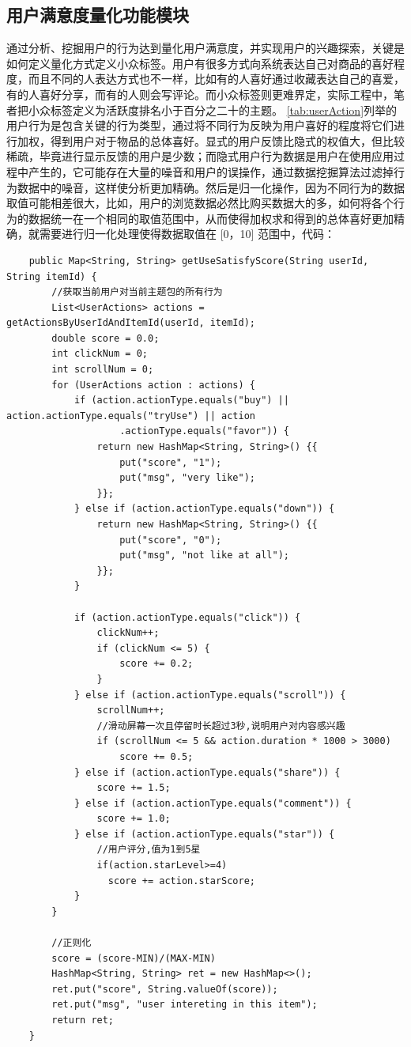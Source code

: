   \subsection{用户满意度量化功能模块}
  通过分析、挖掘用户的行为达到量化用户满意度，并实现用户的兴趣探索，关键是如何定义量化方式定义小众标签。用户有很多方式向系统表达自己对商品的喜好程度，而且不同的人表达方式也不一样，比如有的人喜好通过收藏表达自己的喜爱，有的人喜好分享，而有的人则会写评论。而小众标签则更难界定，实际工程中，笔者把小众标签定义为活跃度排名小于百分之二十的主题。
  \autoref{tab:userAction}列举的用户行为是包含关键的行为类型，通过将不同行为反映为用户喜好的程度将它们进行加权，得到用户对于物品的总体喜好。显式的用户反馈比隐式的权值大，但比较稀疏，毕竟进行显示反馈的用户是少数；而隐式用户行为数据是用户在使用应用过程中产生的，它可能存在大量的噪音和用户的误操作，通过数据挖掘算法过滤掉行为数据中的噪音，这样使分析更加精确。然后是归一化操作，因为不同行为的数据取值可能相差很大，比如，用户的浏览数据必然比购买数据大的多，如何将各个行为的数据统一在一个相同的取值范围中，从而使得加权求和得到的总体喜好更加精确，就需要进行归一化处理使得数据取值在 [0，10] 范围中，代码：
  \begin{lstlisting}
    public Map<String, String> getUseSatisfyScore(String userId, String itemId) {
        //获取当前用户对当前主题包的所有行为
        List<UserActions> actions = getActionsByUserIdAndItemId(userId, itemId);
        double score = 0.0;
        int clickNum = 0;
        int scrollNum = 0;
        for (UserActions action : actions) {
            if (action.actionType.equals("buy") || action.actionType.equals("tryUse") || action
                    .actionType.equals("favor")) {
                return new HashMap<String, String>() {{
                    put("score", "1");
                    put("msg", "very like");
                }};
            } else if (action.actionType.equals("down")) {
                return new HashMap<String, String>() {{
                    put("score", "0");
                    put("msg", "not like at all");
                }};
            } 

            if (action.actionType.equals("click")) {
                clickNum++;
                if (clickNum <= 5) {
                    score += 0.2;
                }
            } else if (action.actionType.equals("scroll")) {
                scrollNum++;
                //滑动屏幕一次且停留时长超过3秒,说明用户对内容感兴趣
                if (scrollNum <= 5 && action.duration * 1000 > 3000) 
                    score += 0.5;
            } else if (action.actionType.equals("share")) {
                score += 1.5;
            } else if (action.actionType.equals("comment")) {
                score += 1.0;
            } else if (action.actionType.equals("star")) {
                //用户评分,值为1到5星
                if(action.starLevel>=4)
                  score += action.starScore;
            }
        }

        //正则化
        score = (score-MIN)/(MAX-MIN)
        HashMap<String, String> ret = new HashMap<>();
        ret.put("score", String.valueOf(score));
        ret.put("msg", "user intereting in this item");
        return ret;
    }
  \end{lstlisting}

